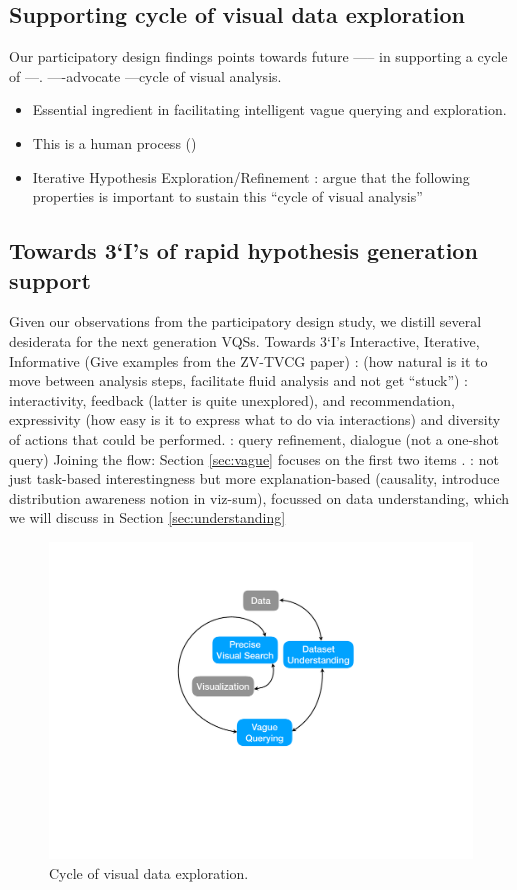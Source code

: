 \subsection{Supporting cycle of visual data exploration}
Our participatory design findings points towards future ----- in supporting a cycle of ---.  ----advocate ---cycle of visual analysis. 
\begin{itemize}
	\item Essential ingredient in facilitating intelligent vague querying and exploration.
	\item This is a human process (\cite{Heer2012,Pirolli})
	\item Iterative Hypothesis Exploration/Refinement : argue that the following properties is important to sustain this “cycle of visual analysis” 
\end{itemize}

\subsection{Towards 3‘I’s of rapid hypothesis generation support}
Given our observations from the participatory design study, we distill several desiderata for the next generation VQSs. 
Towards 3‘I’s Interactive, Iterative, Informative (Give examples from the ZV-TVCG paper)
:
 (how natural is it to move between analysis steps, facilitate fluid analysis and not get ``stuck'') : interactivity, feedback (latter is quite unexplored), and recommendation, expressivity (how easy is it to express what to do via interactions) and diversity of actions that could be performed.
: query refinement, dialogue (not a one-shot query)
Joining the flow: Section \ref{sec:vague} focuses on the first two items .
: not just task-based interestingness but more explanation-based (causality, introduce distribution awareness notion in viz-sum), focussed on data understanding, which we will discuss in Section \ref{sec:understanding}

\begin{figure}[h!]
	\label{fig:cycle}
	\centering
	\includegraphics[width=0.5\linewidth]{figures/cycle.pdf}
	\caption{Cycle of visual data exploration.}
\end{figure}
